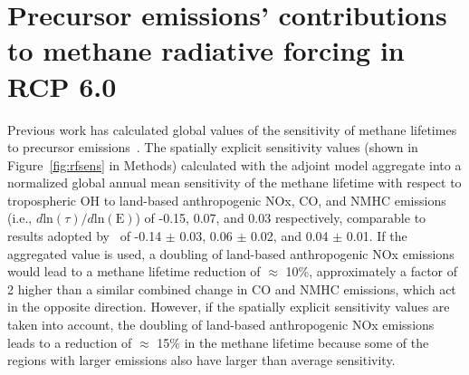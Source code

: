 \section{Precursor emissions' contributions to methane radiative forcing in RCP 6.0}

Previous work has calculated global values of the sensitivity of methane lifetimes to precursor emissions~\citep{ref:fry2012,ref:holmes2013}. The spatially explicit sensitivity values (shown in Figure~\ref{fig:rfsens} in Methods) calculated with the adjoint model aggregate into a normalized global annual mean sensitivity of the methane lifetime with respect to tropospheric OH to land-based anthropogenic NOx, CO, and NMHC emissions (i.e., $d \mathrm{ln}(\tau)/d\mathrm{ln}(\mathrm{E})$) of -0.15, 0.07, and 0.03 respectively, comparable to results adopted by~\citet{ref:holmes2013} of -0.14 $\pm$ 0.03, 0.06 $\pm$ 0.02, and 0.04 $\pm$ 0.01. If the aggregated value is used, a doubling of land-based anthropogenic NOx emissions would lead to a methane lifetime reduction of $\approx$ 10\%, approximately a factor of 2 higher than a similar combined change in CO and NMHC emissions, which act in the opposite direction. However, if the spatially explicit sensitivity values are taken into account, the doubling of land-based anthropogenic NOx emissions leads to a reduction of $\approx$ 15\% in the methane lifetime because some of the regions with larger emissions also have larger than average sensitivity.


